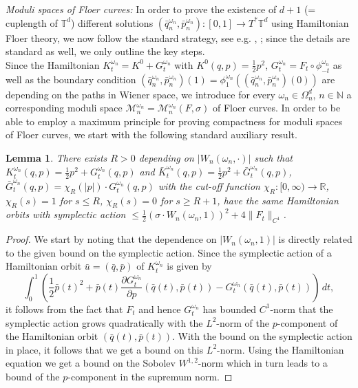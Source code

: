 \documentclass[a4paper,11pt]{amsart}
\newcommand{\NN}{\mathbb{N}}
\newcommand{\RR}{\mathbb{R}}
\newcommand{\TT}{\mathbb{T}}
\newtheorem{lemma}[theorem]{Lemma}
\begin{document}
\noindent\emph{Moduli spaces of Floer curves:} 
In order to prove the existence of $d+1$ (= cuplength of $\TT^d$) different solutions $(\bar{q}_n^{\omega_n},\bar{p}_n^{\omega_n}):[0,1]\to T^*\TT^d$ using Hamiltonian Floer theory, we now follow the standard strategy, see e.g. \cite{AH}, \cite{Sch}; since the details are standard as well, we only outline the key steps.\\
\indent Since the Hamiltonian $K_t^{\omega_n}=K^0+G_t^{\omega_n}$ with $K^0(q,p)=\frac{1}{2}p^2$, $G_t^{\omega_n}=F_t\circ\phi^{\omega_n}_{-t}$ as well as the boundary condition $(\bar{q}_n^{\omega_n},\bar{p}_n^{\omega_n})(1)=\phi^{\omega_n}_1((\bar{q}_n^{\omega_n},\bar{p}_n^{\omega_n})(0))$ are depending on the paths in Wiener space, we introduce for every $\omega_n\in\Omega_n^d$, $n\in\NN$ a corresponding moduli space $\mathcal{M}_n^{\omega_n}=\mathcal{M}_n^{\omega_n}(F,\sigma)$ of Floer curves. In order to be able to employ a maximum principle for proving compactness for moduli spaces of Floer curves, we start with the following standard auxiliary result. 
\begin{lemma}\label{cut-off}
There exists $R>0$ depending on $|W_n(\omega_n,\cdot)|$ such that $K_t^{\omega_n}(q,p)=\frac{1}{2}p^2+G_t^{\omega_n}(q,p)$ and $\bar{K}_t^{\omega_n}(q,p)=\frac{1}{2}p^2+\bar{G}_t^{\omega_n}(q,p)$, $\bar{G}_t^{\omega_n}(q,p)=\chi_R(|p|)\cdot G_t^{\omega_n}(q,p)$ with the cut-off function $\chi_R:[0,\infty)\to\RR$, $\chi_R(s)=1$ for $s\leq R$, $\chi_R(s)=0$ for $s\geq R+1$, have the same Hamiltonian orbits with symplectic action $\leq \frac{1}{2}(\sigma\cdot W_n(\omega_n,1))^2+4\|F_t\|_{C^1}$. 
\end{lemma}
\begin{proof}
We start by noting that the dependence on $|W_n(\omega_n,1)|$ is directly related to the given bound on the symplectic action. Since the symplectic action of a Hamiltonian orbit $\bar{u}=(\bar{q},\bar{p})$ of $K_t^{\omega_n}$ is given by \[\int_0^1 \left(\frac{1}{2}\bar{p}(t)^2+\bar{p}(t)\frac{\partial G_t^{\omega_n}}{\partial p}(\bar{q}(t),\bar{p}(t))-G_t^{\omega_n}(\bar{q}(t),\bar{p}(t))\right)\,dt, \] it follows from the fact that $F_t$ and hence $G_t^{\omega_n}$ has bounded $C^1$-norm that the symplectic action grows quadratically with the $L^2$-norm of the $p$-component of the Hamiltonian orbit $(\bar{q}(t),\bar{p}(t))$. With the bound on the symplectic action in place, it follows that we get a bound on this $L^2$-norm. Using the Hamiltonian equation we get a bound on the Sobolev $W^{1,2}$-norm which in turn leads to a bound of the $p$-component in the supremum norm.      
\end{proof}
\end{document}
